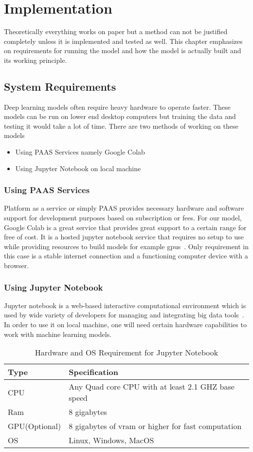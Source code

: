 \chapter{Implementation} \label{ch:implementation}
Theoretically everything works on paper but a method can not be justified completely unless it is implemented and tested as well. This chapter emphasizes on requirements for running the model and how the model is actually built and its working principle.

\section{System Requirements}
Deep learning models often require heavy hardware to operate faster. These models can be run on lower end desktop computers but training the data and testing it would take a lot of time. There are two methods of working on these models
\begin{itemize}
\item Using PAAS Services namely Google Colab
\item Using Jupyter Notebook on local machine
\end{itemize} 
\subsection{Using PAAS Services}
Platform as a service or simply PAAS provides necessary hardware and software support for development purposes based on subscription or fees. For our model, Google Colab is a great service that provides great support to a certain range for free of cost. It is a hosted jupyter notebook service that requires no setup to use while providing resources to build models for example gpus~\cite{url1}. Only requirement in this case is a stable internet connection and a functioning computer device with a browser.
\subsection{Using Jupyter Notebook}
Jupyter notebook is a web-based interactive computational environment which is used by wide variety of developers for managing and integrating big data tools~\cite{url2}. In order to use it on local machine, one will need certain hardware capabilities to work with machine learning models.
\begin{table}
\caption{Hardware and OS Requirement for Jupyter Notebook}
\begin{tabular}{|l|l|}
\hline
Type & Specification \\
\hline
CPU & Any Quad core CPU with at least 2.1 GHZ base speed \\
\hline
Ram & 8 gigabytes \\
\hline
GPU(Optional) & 8 gigabytes of vram or higher for fast computation \\
\hline
OS & Linux, Windows, MacOS \\
\hline
\end{tabular}
\end{table}

